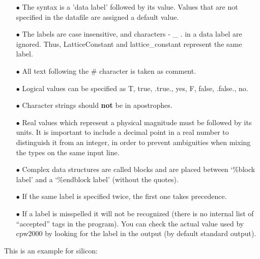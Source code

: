 \documentclass[11pt]{article}
\begin{document}
\begin{itemize}

\item[$\bullet$] The syntax is a 'data label' followed by its value.
Values that are not specified in the datafile are assigned
a default value.

\item[$\bullet$] The labels are case insensitive, and characters - \_ .
in a data label are ignored. Thus, LatticeConstant and
lattice{\_}constant represent the same label.

\item[$\bullet$] All text following the \# character is taken as comment.

\item[$\bullet$] Logical values can be specified as T, true, .true.,
yes, F, false, .false., no.

\item[$\bullet$] Character strings should \textbf{not} be in apostrophes.

\item[$\bullet$] Real values which represent a physical magnitude must be
followed by its units.
It is important to include a decimal point in a real number to distinguish
it from an integer, in order to prevent ambiguities when mixing the types
on the same input line.

\item[$\bullet$] Complex data structures are called blocks and are
placed between `\%block label' and a `\%endblock label'
(without the quotes).

\item[$\bullet$] If the same label is specified twice, the first one takes precedence.

\item[$\bullet$] If a label is misspelled it will not be recognized (there is no
  internal list of ``accepted'' tags in the program). You can check
  the actual value used by {\sc cpw2000} by looking for the label in the
  output (by default standard output).

\end{itemize}

\noindent
This is an example for silicon:
\end{document}
